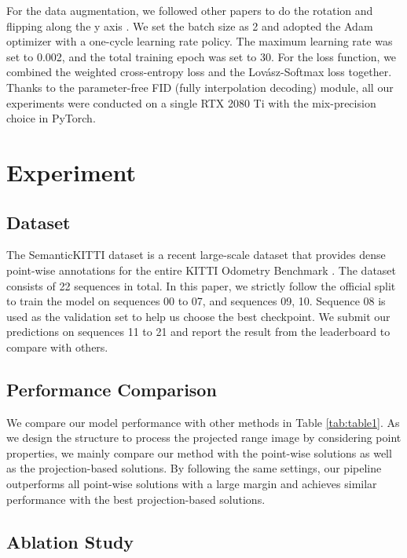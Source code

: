 \documentclass[letterpaper, 10 pt, conference]{ieeeconf}
\begin{document}
For the data augmentation, we followed other papers to do the rotation and flipping along the y axis \cite{gerdzhev2020tornado, cortinhal2020salsanext}. We set the batch size as 2 and adopted the Adam optimizer with a one-cycle learning rate policy. The maximum learning rate was set to 0.002, and the total training epoch was set to 30. For the loss function, we combined the weighted cross-entropy loss \cite{zhang2018generalized} and the Lovász-Softmax loss \cite{berman2018lovasz} together. Thanks to the parameter-free FID (fully interpolation decoding) module, all our experiments were conducted on a single RTX 2080 Ti with the mix-precision choice in PyTorch.
 


\section{Experiment}

\subsection{Dataset}

The SemanticKITTI dataset \cite{behley2019semantickitti} is a recent large-scale dataset that provides dense point-wise annotations for the entire KITTI Odometry Benchmark \cite{geiger2012we}. The dataset consists of 22 sequences in total. In this paper, we strictly follow the official split to train the model on sequences 00 to 07, and sequences 09, 10. Sequence 08 is used as the validation set to help us choose the best checkpoint. We submit our predictions on sequences 11 to 21 and report the result from the leaderboard to compare with others.

\subsection{Performance Comparison}

We compare our model performance with other methods in Table \ref{tab:table1}. As we design the structure to process the projected range image by considering point properties, we mainly compare our method with the point-wise solutions as well as the projection-based solutions. By following the same settings, our pipeline outperforms all point-wise solutions with a large margin and achieves similar performance with the best projection-based solutions. 

\subsection{Ablation Study}
\end{document}
